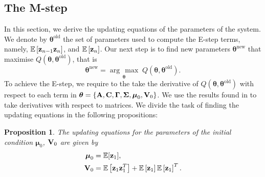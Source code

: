 \documentclass[11pt]{article}
\numberwithin{equation}{section}
\newcommand{\argmax}[1]{\underset{#1}{\operatorname{arg}\,\operatorname{max}}\;}
\newcommand{\expectation}[1]{\mathbb{E}\left[#1\right]}
\newcommand{\z}{{\bf z}}
\newtheorem{proposition}{Proposition}[section]
\begin{document}
\subsection{The M-step}
In this section, we derive the updating equations of the parameters of the system. We denote by $\boldsymbol{\theta}^\text{old}$ the set of parameters used to compute the E-step terms, namely, $\expectation{\z_{n-1}\z_{n}}$, and $\expectation{\z_{n}}$. Our next step is to find new parameters $\boldsymbol{\theta}^\text{new}$ that maximise $Q(\boldsymbol\theta, \boldsymbol\theta^\text{old})$, that is
\begin{equation}
	\boldsymbol{\theta}^\text{new} = \argmax{\boldsymbol\theta} Q(\boldsymbol\theta, \boldsymbol\theta^\text{old}).
\end{equation}
To achieve the E-step, we require to the take the derivative of $Q(\boldsymbol{\theta}, \boldsymbol{\theta}^\text{old})$ with respect to each term in $\boldsymbol\theta = \{{\bf A}, {\bf C}, \boldsymbol\Gamma, \boldsymbol\Sigma, \boldsymbol\mu_0, {\bf V}_0\}$. We use the results found in \cite{matrix-cookbook} to take derivatives with respect to matrices. We divide the task of finding the updating equations in the following propositions:

\begin{proposition}
	The updating equations for the parameters of the initial condition $\boldsymbol{\mu}_0$, ${\bf V}_0$ are given by
	\begin{align}
		\boldsymbol{\mu}_0 &= \mathbb{E}[{\z_1}], \\
		{\bf V}_0 &= \expectation{\z_1 \z_1^T} + \expectation{\z_1}\expectation{\z_1}^T.
	\end{align}
\end{proposition}
\end{document}
